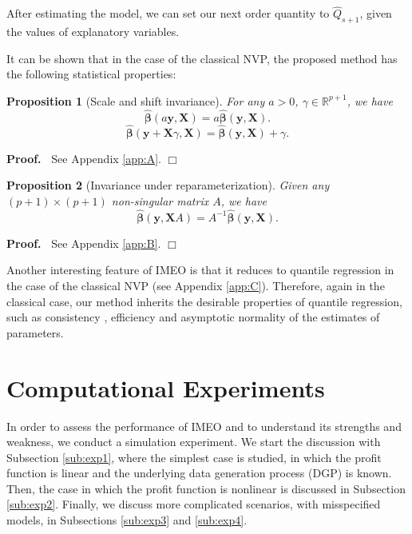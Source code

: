 \documentclass[a4paper,11pt]{article}
\newtheorem{proposition}{Proposition}
\newenvironment{proof}
 {\begin{trivlist} \item[] {\bf Proof.\ }}{\hfill$\Box$ \end{trivlist}}
\begin{document}
After estimating the model, we can set our next order quantity to $\hat{Q}_{s+1}$, given the values of explanatory variables.

It can be shown that in the case of the classical NVP, the proposed method has the following statistical properties:
\begin{proposition}[Scale and shift invariance]
For any $a>0$, $\gamma\in \mathbb{R}^{p+1}$, we have
\[
    \hat{\boldsymbol{\beta}}(a\mathbf{y},\mathbf{X})=a\hat{\boldsymbol{\beta}}(\mathbf{y},\mathbf{X}).
\]
\[
    \hat{\boldsymbol{\beta}}(\mathbf{y}+\mathbf{X}\gamma,\mathbf{X})=
    \hat{\boldsymbol{\beta}}(\mathbf{y},\mathbf{X})+\gamma.
\]
\end{proposition}
\begin{proof}
See Appendix \ref{app:A}.
\end{proof}

\begin{proposition}[Invariance under reparameterization]
Given any $(p+1)\times (p+1)$ non-singular matrix $A$, we have
\[
        \hat{\boldsymbol{\beta}}(\mathbf{y},\mathbf{X}A)=A^{-1}\hat{\boldsymbol{\beta}}(\mathbf{y},\mathbf{X}).
\]
\end{proposition}
\begin{proof}
See Appendix \ref{app:B}.
\end{proof}

Another interesting feature of IMEO is that it reduces to quantile regression in the case of the classical NVP (see Appendix \ref{app:C}). Therefore, again in the classical case, our method inherits the desirable properties of quantile regression, such as consistency \cite{Koe05}, efficiency \cite{KM99} and asymptotic normality \cite{KHM05} of the estimates of parameters.

\section{Computational Experiments} \label{se:results}

In order to assess the performance of IMEO and to understand its strengths and weakness, we conduct a simulation experiment. We start the discussion with Subsection \ref{sub:exp1}, where the simplest case is studied, in which the profit function is linear and the underlying data generation process (DGP) is known. Then, the case in which the profit function is nonlinear is discussed in Subsection \ref{sub:exp2}. Finally, we discuss more complicated scenarios, with misspecified models, in Subsections \ref{sub:exp3} and \ref{sub:exp4}.
\end{document}
